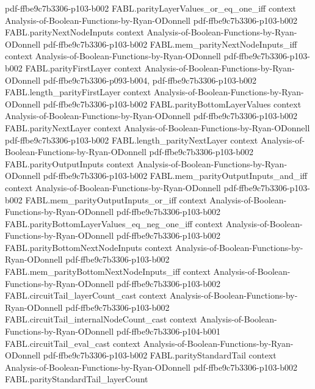 \begin{theorem}
  {pdf-ffbe9c7b3306-p103-b002}
\proofstep
  {FABL.parityLayerValues_or_eq_one_iff}
  {context}
  {Analysis-of-Boolean-Functions-by-Ryan-ODonnell}
  {pdf-ffbe9c7b3306-p103-b002}
\proofstep
  {FABL.parityNextNodeInputs}
  {context}
  {Analysis-of-Boolean-Functions-by-Ryan-ODonnell}
  {pdf-ffbe9c7b3306-p103-b002}
\proofstep
  {FABL.mem_parityNextNodeInputs_iff}
  {context}
  {Analysis-of-Boolean-Functions-by-Ryan-ODonnell}
  {pdf-ffbe9c7b3306-p103-b002}
\proofstep
  {FABL.parityFirstLayer}
  {context}
  {Analysis-of-Boolean-Functions-by-Ryan-ODonnell}
  {pdf-ffbe9c7b3306-p093-b004,
    pdf-ffbe9c7b3306-p103-b002}
\proofstep
  {FABL.length_parityFirstLayer}
  {context}
  {Analysis-of-Boolean-Functions-by-Ryan-ODonnell}
  {pdf-ffbe9c7b3306-p103-b002}
\proofstep
  {FABL.parityBottomLayerValues}
  {context}
  {Analysis-of-Boolean-Functions-by-Ryan-ODonnell}
  {pdf-ffbe9c7b3306-p103-b002}
\proofstep
  {FABL.parityNextLayer}
  {context}
  {Analysis-of-Boolean-Functions-by-Ryan-ODonnell}
  {pdf-ffbe9c7b3306-p103-b002}
\proofstep
  {FABL.length_parityNextLayer}
  {context}
  {Analysis-of-Boolean-Functions-by-Ryan-ODonnell}
  {pdf-ffbe9c7b3306-p103-b002}
\proofstep
  {FABL.parityOutputInputs}
  {context}
  {Analysis-of-Boolean-Functions-by-Ryan-ODonnell}
  {pdf-ffbe9c7b3306-p103-b002}
\proofstep
  {FABL.mem_parityOutputInputs_and_iff}
  {context}
  {Analysis-of-Boolean-Functions-by-Ryan-ODonnell}
  {pdf-ffbe9c7b3306-p103-b002}
\proofstep
  {FABL.mem_parityOutputInputs_or_iff}
  {context}
  {Analysis-of-Boolean-Functions-by-Ryan-ODonnell}
  {pdf-ffbe9c7b3306-p103-b002}
\proofstep
  {FABL.parityBottomLayerValues_eq_neg_one_iff}
  {context}
  {Analysis-of-Boolean-Functions-by-Ryan-ODonnell}
  {pdf-ffbe9c7b3306-p103-b002}
\proofstep
  {FABL.parityBottomNextNodeInputs}
  {context}
  {Analysis-of-Boolean-Functions-by-Ryan-ODonnell}
  {pdf-ffbe9c7b3306-p103-b002}
\proofstep
  {FABL.mem_parityBottomNextNodeInputs_iff}
  {context}
  {Analysis-of-Boolean-Functions-by-Ryan-ODonnell}
  {pdf-ffbe9c7b3306-p103-b002}
\proofstep
  {FABL.circuitTail_layerCount_cast}
  {context}
  {Analysis-of-Boolean-Functions-by-Ryan-ODonnell}
  {pdf-ffbe9c7b3306-p103-b002}
\proofstep
  {FABL.circuitTail_internalNodeCount_cast}
  {context}
  {Analysis-of-Boolean-Functions-by-Ryan-ODonnell}
  {pdf-ffbe9c7b3306-p104-b001}
\proofstep
  {FABL.circuitTail_eval_cast}
  {context}
  {Analysis-of-Boolean-Functions-by-Ryan-ODonnell}
  {pdf-ffbe9c7b3306-p103-b002}
\proofstep
  {FABL.parityStandardTail}
  {context}
  {Analysis-of-Boolean-Functions-by-Ryan-ODonnell}
  {pdf-ffbe9c7b3306-p103-b002}
\proofstep
  {FABL.parityStandardTail_layerCount}

\end{theorem}
